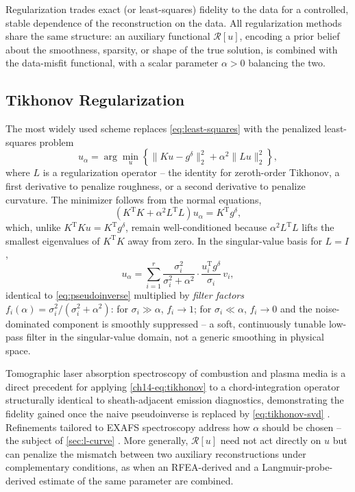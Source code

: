 Regularization trades exact (or least-squares) fidelity to the data for a controlled, stable dependence of the reconstruction on the data. All regularization methods share the same structure: an auxiliary functional $\mathcal{R}[u]$, encoding a prior belief about the smoothness, sparsity, or shape of the true solution, is combined with the data-misfit functional, with a scalar parameter $\alpha > 0$ balancing the two.

\subsection{Tikhonov Regularization}

The most widely used scheme replaces \cref{eq:least-squares} with the penalized least-squares problem
\begin{equation}
u_{\alpha} = \arg\min_{u} \left\{ \| Ku - g^{\delta} \|_{2}^{2} + \alpha^{2} \| Lu \|_{2}^{2} \right\},
\label{ch14-eq:tikhonov}
\end{equation}
where $L$ is a regularization operator -- the identity for zeroth-order Tikhonov, a first derivative to penalize roughness, or a second derivative to penalize curvature. The minimizer follows from the normal equations,
\begin{equation}
\left( K^{\mathrm{T}} K + \alpha^{2} L^{\mathrm{T}} L \right) u_{\alpha} = K^{\mathrm{T}} g^{\delta},
\label{eq:tikhonov-normal}
\end{equation}
which, unlike $K^{\mathrm{T}} K u = K^{\mathrm{T}} g^{\delta}$, remain well-conditioned because $\alpha^{2} L^{\mathrm{T}} L$ lifts the smallest eigenvalues of $K^{\mathrm{T}}K$ away from zero. In the singular-value basis for $L = I$,
\begin{equation}
u_{\alpha} = \sum_{i=1}^{r} \frac{\sigma_{i}^{2}}{\sigma_{i}^{2} + \alpha^{2}} \cdot \frac{u_{i}^{\mathrm{T}} g^{\delta}}{\sigma_{i}}\, v_{i},
\label{eq:tikhonov-svd}
\end{equation}
identical to \cref{eq:pseudoinverse} multiplied by \emph{filter factors} $f_{i}(\alpha) = \sigma_{i}^{2}/(\sigma_{i}^{2}+\alpha^{2})$: for $\sigma_{i} \gg \alpha$, $f_{i} \to 1$; for $\sigma_{i} \ll \alpha$, $f_{i} \to 0$ and the noise-dominated component is smoothly suppressed -- a soft, continuously tunable low-pass filter in the singular-value domain, not a generic smoothing in physical space.

Tomographic laser absorption spectroscopy of combustion and plasma media is a direct precedent for applying \cref{ch14-eq:tikhonov} to a chord-integration operator structurally identical to sheath-adjacent emission diagnostics, demonstrating the fidelity gained once the naive pseudoinverse is replaced by \cref{eq:tikhonov-svd} \cite{ref0677}. Refinements tailored to EXAFS spectroscopy address how $\alpha$ should be chosen -- the subject of \cref{sec:l-curve} \cite{ref0695}. More generally, $\mathcal{R}[u]$ need not act directly on $u$ but can penalize the mismatch between two auxiliary reconstructions under complementary conditions, as when an RFEA-derived and a Langmuir-probe-derived estimate of the same parameter are combined.

